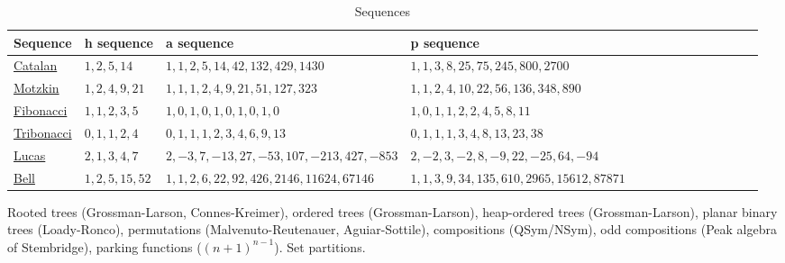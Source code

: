 \documentclass[11pt]{amsart}
\theoremstyle{definition}
\numberwithin{equation}{section}
\begin{document}
 \begin{table}[h]
    \hspace*{-1cm} 
    \begin{tabular}{|l|l|l|l||l|l|l||l|l|l|l||l|l|l|}
        \hline
        Sequence & h sequence & a sequence & p sequence \\
        \hline
        \href{https://oeis.org/A000108}{Catalan} & \(1, 2, 5, 14\) & 
        \(1, 1, 2, 5, 14, 42, 132, 429, 1430\) & 
        \(1, 1, 3, 8, 25, 75, 245, 800, 2700\) \\
        
        
        \hline
        \href{https://oeis.org/A001006}{Motzkin}  & \(1, 2, 4, 9, 21\) & 
        \(1, 1, 1, 2, 4, 9, 21, 51, 127, 323\) & 
        \(1, 1, 2, 4, 10, 22, 56, 136, 348, 890\)

          \\
        \hline
        \href{https://oeis.org/A000045}{ Fibonacci}
        & \(1, 1, 2, 3,5\) & 
        \(1, 0, 1, 0, 1, 0, 1, 0, 1, 0\) & 
        \(1, 0, 1, 1, 2, 2, 4, 5, 8, 11\)

         \\
        \hline
        \href{https://oeis.org/A000073}{Tribonacci} & \(0, 1, 1, 2, 4\) & 
        \(0, 1, 1, 1, 2, 3, 4, 6, 9, 13\) & 
        \(0, 1, 1, 1, 3, 4, 8, 13, 23, 38\)

             \\
        \hline
        \href{https://oeis.org/A000032}{Lucas} & \(2, 1, 3, 4, 7\) & 
        \(2, -3, 7, -13, 27, -53, 107, -213, 427, -853\) & 
        \(2, -2, 3, -2, 8, -9, 22, -25, 64, -94\)

         \\
        \hline
        \href{https://oeis.org/A000110}{Bell}
         & \(1, 2, 5, 15, 52\) & 
        \(1, 1, 2, 6, 22, 92, 426, 2146, 11624, 67146\) & 
        \(1, 1, 3, 9, 34, 135, 610, 2965, 15612, 87871\)


   \\
      
        \hline
    \end{tabular}
    \caption{Sequences}
    \label{tab:sequences}
\end{table}

Rooted trees (Grossman-Larson, Connes-Kreimer),
ordered trees (Grossman-Larson),
heap-ordered trees (Grossman-Larson),
planar binary trees (Loady-Ronco), permutations (Malvenuto-Reutenauer, Aguiar-Sottile),
compositions (QSym/NSym), odd compositions (Peak algebra of Stembridge),
parking functions ($(n+1)^{n-1}$).
Set partitions.
\end{document}

